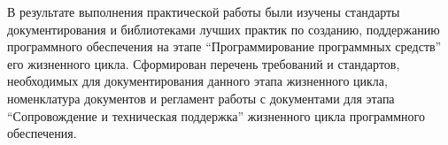 
\pagebreak
{}

В результате выполнения практической работы были изучены стандарты документирования и библиотеками лучших практик по созданию, поддержанию программного обеспечения на этапе \enquote{Программирование программных средств} его жизненного цикла.
Сформирован перечень требований и стандартов, необходимых для документирования данного этапа жизненного цикла, номенклатура документов и регламент работы с документами для этапа
\enquote{Сопровождение и техническая поддержка} жизненного цикла программного обеспечения.

